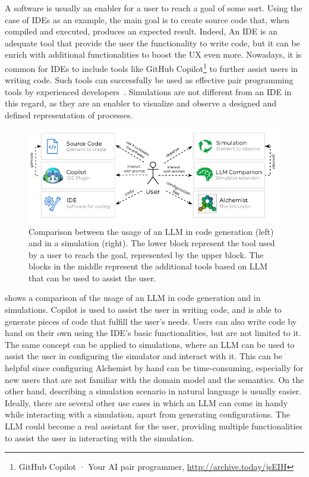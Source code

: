 \documentclass[conference]{IEEEtran}
\begin{document}
A software is usually an enabler for a user to reach a goal of some sort.
%
Using the case of \acp{IDE} as an example,
the main goal is to create source code that,
when compiled and executed,
produces an expected result.
%
Indeed,
An IDE is an adequate tool that provide the user the functionality to write code,
but it can be enrich with additional functionalities to boost the \ac{UX} even more.
%
Nowadays,
it is common for \acp{IDE} to include tools like GitHub Copilot\footnote{
    GitHub Copilot · Your AI pair programmer, \url{http://archive.today/jsEIH}
} to further assist users in writing code.
%
Such tools can successfully be used as effective pair programming tools by experienced developers~\cite{DBLP:journals/jss/DakhelMNKDJ23}.
%
Simulations are not different from an \ac{IDE} in this regard,
as they are an enabler to visualize and observe a designed and defined representation of processes.
%
\begin{figure}
    \includegraphics[width=\columnwidth]{use-case}
    \caption{
        Comparison between the usage of an LLM in code generation (left) and in a simulation (right).
        The lower block represent the tool used by a user to reach the goal, represented by the upper block.
        The blocks in the middle represent the additional tools based on LLM that can be used to assist the user.
    }
    \label{fig:usecase}
\end{figure}
%
 shows a comparison of the usage of an \ac{LLM} in code generation and in simulations.
%
Copilot is used to assist the user in writing code,
and is able to generate pieces of code that fulfill the user's needs.
%
Users can also write code by hand on their own using the \ac{IDE}'s basic functionalities,
but are not limited to it.
%
The same concept can be applied to simulations,
where an \ac{LLM} can be used to assist the user in configuring the simulator and interact with it.
%
This can be helpful since configuring Alchemist by hand can be time-consuming,
especially for new users that are not familiar with the domain model and the semantics.
%
On the other hand,
describing a simulation scenario in natural language is usually easier.
%
Ideally,
there are several other use cases in which an \ac{LLM} can come in handy while interacting with a simulation, apart from generating configurations.
%
The \ac{LLM} could become a real assistant for the user,
providing multiple functionalities to assist the user in interacting with the simulation.
%
\end{document}
